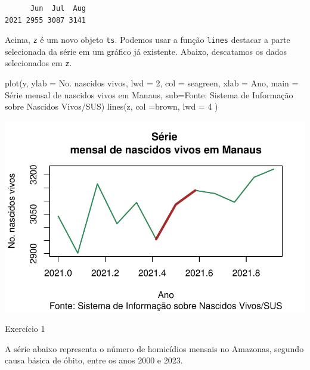 \documentclass[
  letterpaper,
  DIV=11,
  numbers=noendperiod]{scrreprt}
\newenvironment{Shaded}{\begin{snugshade}}{\end{snugshade}}
\newcommand{\AttributeTok}[1]{\textcolor[rgb]{0.40,0.45,0.13}{#1}}
\newcommand{\DecValTok}[1]{\textcolor[rgb]{0.68,0.00,0.00}{#1}}
\newcommand{\FunctionTok}[1]{\textcolor[rgb]{0.28,0.35,0.67}{#1}}
\newcommand{\NormalTok}[1]{\textcolor[rgb]{0.00,0.23,0.31}{#1}}
\newcommand{\StringTok}[1]{\textcolor[rgb]{0.13,0.47,0.30}{#1}}
\begin{document}
\begin{verbatim}
      Jun  Jul  Aug
2021 2955 3087 3141
\end{verbatim}

Acima, \texttt{z} é um novo objeto \texttt{ts}. Podemos usar a função
\texttt{lines} destacar a parte selecionada da série em um gráfico já
existente. Abaixo, descatamos os dados selecionados em \texttt{z}.

\begin{Shaded}
\begin{Highlighting}[]
\FunctionTok{plot}\NormalTok{(y, }\AttributeTok{ylab =} \StringTok{\textquotesingle{}No. nascidos vivos\textquotesingle{}}\NormalTok{, }\AttributeTok{lwd =} \DecValTok{2}\NormalTok{, }\AttributeTok{col =} \StringTok{\textquotesingle{}seagreen\textquotesingle{}}\NormalTok{, }\AttributeTok{xlab =} \StringTok{\textquotesingle{}Ano\textquotesingle{}}\NormalTok{, }\AttributeTok{main =} \StringTok{\textquotesingle{}Série }
\StringTok{mensal de nascidos vivos em Manaus\textquotesingle{}}\NormalTok{, }\AttributeTok{sub=}\StringTok{\textquotesingle{}Fonte: Sistema de Informação sobre Nascidos Vivos/SUS\textquotesingle{}}\NormalTok{)}
\FunctionTok{lines}\NormalTok{(z, }\AttributeTok{col =}\StringTok{\textquotesingle{}brown\textquotesingle{}}\NormalTok{, }\AttributeTok{lwd =} \DecValTok{4}\NormalTok{ )}
\end{Highlighting}
\end{Shaded}

\includegraphics{intro_files/figure-pdf/unnamed-chunk-6-1.pdf}

Exercício 1

A série abaixo representa o número de homicídios mensais no Amazonas,
segundo causa básica de óbito, entre os anos 2000 e 2023.
\end{document}
